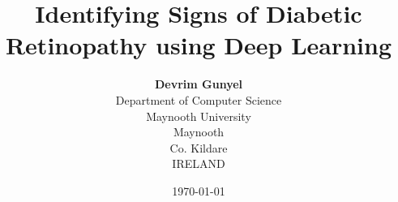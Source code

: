 \documentclass[a4paper,12pt]{report}
\begin{document}
\author{\textbf{Devrim Gunyel}\\[1ex]
  Department of Computer Science\\
  Maynooth University\\
  Maynooth\\
  Co. Kildare\\
  IRELAND}
\date{\today}
\title{Identifying Signs of Diabetic Retinopathy using Deep Learning}
\maketitle






\tableofcontents

\newpage







\renewcommand{\bibsection}{\chapter{Bibliography}}
\cleardoublepage
\end{document}
